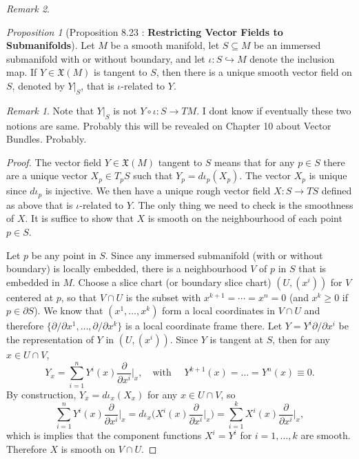 \documentclass[a4paper]{article}
\theoremstyle{remark}
\newtheorem*{remark}{Remark}
\newtheorem{prop}{Proposition}
\newcommand{\doo}{\partial}    %
\newcommand{\subhim}{\subseteq} %
\newcommand{\VF}{\mathfrak{X}} %
\begin{document}
\begin{remark}
\begin{prop}[Proposition 8.23 : \textbf{Restricting Vector Fields to Submanifolds}]
Let $M$ be a smooth manifold, let $S \subhim M$ be an immersed submanifold with or without boundary, and let $\iota : S \hookrightarrow M$ denote the inclusion map. If $Y \in \VF(M)$ is tangent to $S$, then there is a unique smooth vector field on $S$, denoted by $Y|_S$, that is $\iota$-related to $Y$. 
\end{prop}
\begin{remark}
Note that $Y|_S$ is not $Y \circ \iota : S \to TM$. I dont know if eventually these two notions are same. Probably this will be revealed on Chapter 10 about Vector Bundles. Probably.
\end{remark}
\begin{proof}
The vector field $Y \in \VF(M)$ tangent to $S$ means that for any $p \in S$ there are a unique vector $X_p \in T_pS$ such that $Y_p = d\iota_p(X_p)$.  The vector $X_p$ is unique since $d\iota_p$ is injective. We then have a unique rough vector field $X : S \to TS$ defined as above that is $\iota$-related to $Y$. The only thing we need to check is the smoothness of $X$. It is suffice to show that $X$ is smooth on the neighbourhood of each point $p \in S$. 

Let $p $ be any point in $S$. Since any immersed submanifold (with or without boundary) is locally embedded, there is a neighbourhood $V$ of $p $ in $S$ that is embedded in $M$. Choose a slice chart (or boundary slice chart) $(U,(x^i))$ for $V$ centered at $p$, so that $V\cap U$ is the subset with $x^{k+1} = \cdots=x^n = 0$ (and $x^k\geq 0$ if $p \in \doo S$). We know that $(x^1,\dots,x^k)$ form a local coordinates in $V\cap U$ and therefore $\{ \doo/\doo x^1,\dots,\doo/\doo x^k \}$ is a local coordinate frame there. Let $Y = Y^i \doo/\doo x^i$ be the representation of $Y$ in $(U,(x^i))$. Since $Y$ is tangent at $S$, then for any $x \in U\cap V$,
$$
Y_x =\sum_{i=1}^{n} Y^i(x) \frac{\doo}{\doo x^i}\Big|_x, \quad \text{with } \quad Y^{k+1}(x) = \dots = Y^n(x) \equiv 0.
$$
By construction, $Y_x = d\iota_x(X_x)$ for any $x \in U \cap V$, so 
$$
\sum_{i=1}^{n} Y^i(x) \frac{\doo}{\doo x^i}\bigg|_x = d\iota_x \bigg( X^i(x) \frac{\doo}{\doo x^i}\bigg|_x \bigg) = \sum_{i=1}^{k}X^i(x) \frac{\doo}{\doo x^i}\bigg|_x,
$$
which is implies that the component functions $X^i = Y^i$ for $i=1,\dots,k$ are smooth. Therefore $X$ is smooth on $V \cap U$.
\end{proof}


\end{remark}
\end{document}
